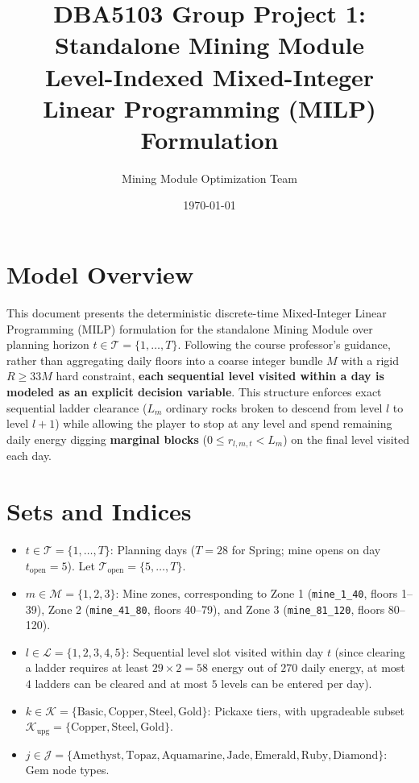 \documentclass[11pt,a4paper]{article}
\title{\textbf{DBA5103 Group Project 1: Standalone Mining Module}\\
\large Level-Indexed Mixed-Integer Linear Programming (MILP) Formulation}
\author{Mining Module Optimization Team}
\date{\today}
\begin{document}
\maketitle

\section{Model Overview}
This document presents the deterministic discrete-time Mixed-Integer Linear Programming (MILP) formulation for the standalone Mining Module over planning horizon $t \in \mathcal{T} = \{1, \dots, T\}$. Following the course professor's guidance, rather than aggregating daily floors into a coarse integer bundle $M$ with a rigid $R \ge 33 M$ hard constraint, \textbf{each sequential level visited within a day is modeled as an explicit decision variable}. This structure enforces exact sequential ladder clearance ($L_m$ ordinary rocks broken to descend from level $l$ to level $l+1$) while allowing the player to stop at any level and spend remaining daily energy digging \textbf{marginal blocks} ($0 \le r_{l,m,t} < L_m$) on the final level visited each day.

\section{Sets and Indices}
\begin{itemize}
    \item $t \in \mathcal{T} = \{1, \dots, T\}$: Planning days ($T = 28$ for Spring; mine opens on day $t_{\text{open}} = 5$). Let $\mathcal{T}_{\text{open}} = \{5, \dots, T\}$.
    \item $m \in \mathcal{M} = \{1, 2, 3\}$: Mine zones, corresponding to Zone 1 (\texttt{mine\_1\_40}, floors 1--39), Zone 2 (\texttt{mine\_41\_80}, floors 40--79), and Zone 3 (\texttt{mine\_81\_120}, floors 80--120).
    \item $l \in \mathcal{L} = \{1, 2, 3, 4, 5\}$: Sequential level slot visited within day $t$ (since clearing a ladder requires at least $29 \times 2 = 58$ energy out of $270$ daily energy, at most $4$ ladders can be cleared and at most $5$ levels can be entered per day).
    \item $k \in \mathcal{K} = \{\text{Basic}, \text{Copper}, \text{Steel}, \text{Gold}\}$: Pickaxe tiers, with upgradeable subset $\mathcal{K}_{\text{upg}} = \{\text{Copper}, \text{Steel}, \text{Gold}\}$.
    \item $j \in \mathcal{J} = \{\text{Amethyst}, \text{Topaz}, \text{Aquamarine}, \text{Jade}, \text{Emerald}, \text{Ruby}, \text{Diamond}\}$: Gem node types.
\end{itemize}
\end{document}
